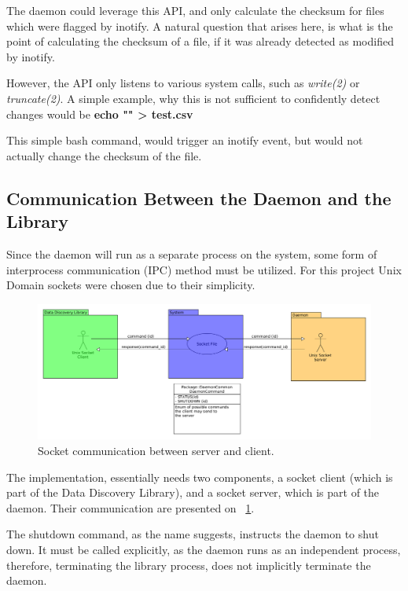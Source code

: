 The daemon could leverage this API, and only calculate the checksum for files which were flagged by inotify.
A natural question that arises here, is what is the point of calculating the checksum of a file,
if it was already detected as modified by inotify.

However, the API only listens to various system calls, such as \textit{write(2)} or \textit{truncate(2)}.
A simple example, why this is not sufficient to confidently detect changes would be \textbf{echo "" > test.csv}

This simple bash command, would trigger an inotify event, but would not actually change the checksum of the file.

\subsection{Communication Between the Daemon and the Library}
Since the daemon will run as a separate process on the system, some form of interprocess communication (IPC) method
must be utilized.
For this project Unix Domain sockets were chosen due to their simplicity.

\begin{figure}[h]
    \centering
    \includegraphics[width=12cm]{figures/daemon/socket_communication}
    \caption{Socket communication between server and client.}
    \label{fig:daemon_fig_1}
\end{figure}


The implementation, essentially needs two components, a socket client (which is part of the Data Discovery Library),
and a socket server, which is part of the daemon. Their communication are presented on ~\ref{fig:daemon_fig_1}.

The shutdown command, as the name suggests, instructs the daemon to shut down.
It must be called explicitly, as the daemon runs as an independent process, therefore,
terminating the library process, does not implicitly terminate the daemon.

